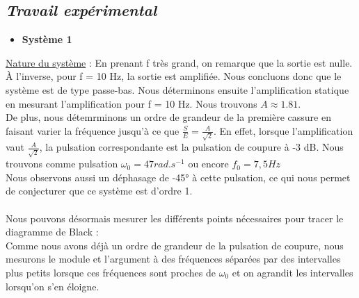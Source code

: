 \documentclass[12pt]{article}
\begin{document}
\subsection{\itshape Travail expérimental}

\begin{itemize}
    \item \bf Système 1
\end{itemize}

\underline{Nature du système} : En prenant f très grand, on remarque que la sortie est nulle. À l'inverse, pour f = 10 Hz, la sortie est amplifiée.
Nous concluons donc que le système est de type passe-bas. Nous déterminons ensuite l'amplification statique en mesurant l'amplification pour f = 10 Hz. Nous trouvons $A \approx 1.81$.
\\De plus, nous détemrminons un ordre de grandeur de la première cassure en faisant varier la fréquence jusqu'à ce que $\frac{S}{E} = \frac{A}{\sqrt{2}}$.
En effet, lorsque l'amplification vaut $\frac{A}{\sqrt{2}}$, la pulsation correspondante est la pulsation de coupure à -3 dB. Nous trouvons comme pulsation $\omega_0 = 47  rad.s^{-1}$ ou encore $f_0 = 7,5 Hz$
\\Nous observons aussi un déphasage de -45° à cette pulsation, ce qui nous permet de conjecturer que ce système est d'ordre 1.
\\\\
Nous pouvons désormais mesurer les différents points nécessaires pour tracer le diagramme de Black : 
\\
Comme nous avons déjà un ordre de grandeur de la pulsation de coupure, nous mesurons le module et l'argument à des fréquences séparées par des intervalles plus petits lorsque ces fréquences sont proches de $\omega_0$ et on agrandit les intervalles lorsqu'on s'en éloigne.
\end{document}
